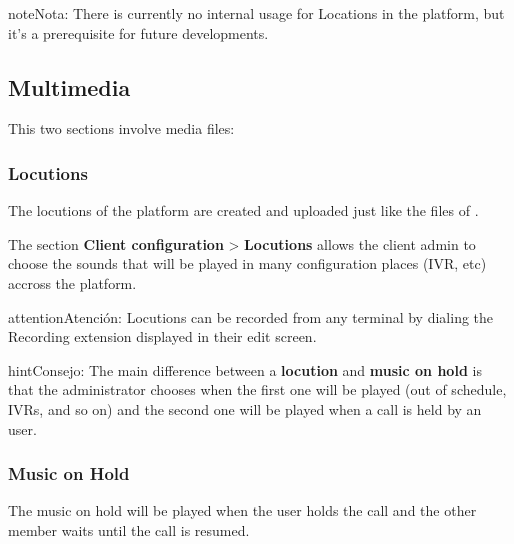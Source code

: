 \documentclass[letterpaper,10pt,spanish]{sphinxmanual}
\begin{document}
\begin{notice}{note}{Nota:}
There is currently no internal usage for Locations in the
platform, but it's a prerequisite for future developments.
\end{notice}


\subsection{Multimedia}
\label{administration_portal/client/vpbx/multimedia/index:multimedia}\label{administration_portal/client/vpbx/multimedia/index::doc}
This two sections involve media files:


\subsubsection{Locutions}
\label{administration_portal/client/vpbx/multimedia/locutions:locutions}\label{administration_portal/client/vpbx/multimedia/locutions::doc}
The locutions of the platform are created and uploaded just like the files of
{\hyperref[administration_portal/client/vpbx/multimedia/music_on_hold:musiconhold]{}}.

The section \textbf{Client configuration} \textgreater{} \textbf{Locutions}  allows the client admin
to choose the sounds that will be played in many configuration places (IVR, etc)
accross the platform.

\begin{notice}{attention}{Atención:}
Locutions can be recorded from any terminal by dialing the
Recording extension displayed in their edit screen.
\end{notice}

\begin{notice}{hint}{Consejo:}
The main difference between a \textbf{locution} and \textbf{music on hold} is
that the administrator chooses when the first one will be played (out of
schedule, IVRs, and so on) and the second one will be played when a call is
held by an user.
\end{notice}
\label{administration_portal/client/vpbx/multimedia/music_on_hold:musiconhold}

\subsubsection{Music on Hold}
\label{administration_portal/client/vpbx/multimedia/music_on_hold:music-on-hold}\label{administration_portal/client/vpbx/multimedia/music_on_hold::doc}\label{administration_portal/client/vpbx/multimedia/music_on_hold:musiconhold}\label{administration_portal/client/vpbx/multimedia/music_on_hold:id1}
The music on hold will be played when the user holds the call and the other
member waits until the call is resumed.
\end{document}
